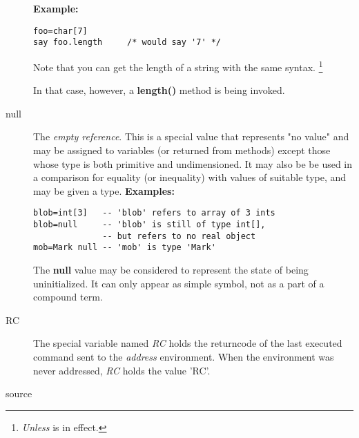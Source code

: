 \begin{description}
\textbf{Example:}
\begin{lstlisting}
foo=char[7]
say foo.length     /* would say '7' */
\end{lstlisting}
 
Note that you can get the length of a \nr{} string with the
same syntax.
\footnote{\emph{Unless } is in effect.}

In that case, however, a \textbf{length()} method is being invoked.
\item[null]\label{refswnull}
 
The \emph{empty reference}.  This is a special value that represents
"no value" and may be assigned to variables (or returned from
methods) except those whose type is both primitive and undimensioned.
It may also be be used in a comparison for equality (or inequality) with
values of suitable type, and may be given a type.
 \textbf{Examples:}
\begin{lstlisting}
blob=int[3]   -- 'blob' refers to array of 3 ints
blob=null     -- 'blob' is still of type int[],
              -- but refers to no real object
mob=Mark null -- 'mob' is type 'Mark'
\end{lstlisting}
 The \textbf{null} value may be considered to represent the state of
being uninitialized.  It can only appear as simple symbol, not as a part
of a compound term.

\item[RC]\label{refswrc}
 
The special variable named \emph{RC} holds the returncode of the last executed command sent
to the \emph{address} environment.
When the environment was never addressed, \emph{RC} holds the value 'RC'. 
\item[source]\label{refswsourc}
 

\end{description}
